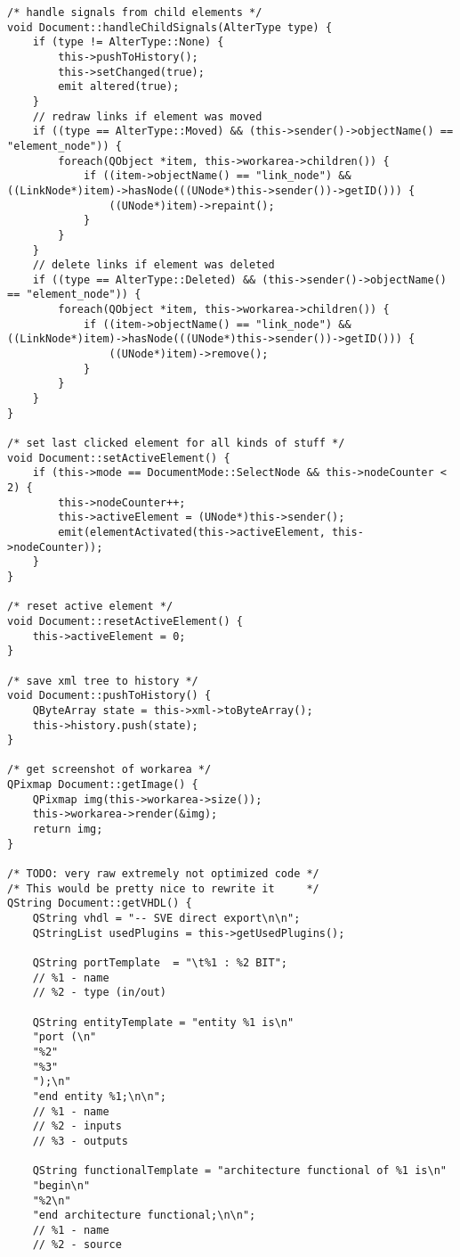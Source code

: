 \begin{lstlisting}
/* handle signals from child elements */
void Document::handleChildSignals(AlterType type) {
    if (type != AlterType::None) {
        this->pushToHistory();
        this->setChanged(true);
        emit altered(true);
    }
    // redraw links if element was moved
    if ((type == AlterType::Moved) && (this->sender()->objectName() == "element_node")) {
        foreach(QObject *item, this->workarea->children()) {
            if ((item->objectName() == "link_node") && ((LinkNode*)item)->hasNode(((UNode*)this->sender())->getID())) {
                ((UNode*)item)->repaint();
            }
        }
    }
    // delete links if element was deleted
    if ((type == AlterType::Deleted) && (this->sender()->objectName() == "element_node")) {
        foreach(QObject *item, this->workarea->children()) {
            if ((item->objectName() == "link_node") && ((LinkNode*)item)->hasNode(((UNode*)this->sender())->getID())) {
                ((UNode*)item)->remove();
            }
        }
    }
}

/* set last clicked element for all kinds of stuff */
void Document::setActiveElement() {
    if (this->mode == DocumentMode::SelectNode && this->nodeCounter < 2) {
        this->nodeCounter++;
        this->activeElement = (UNode*)this->sender();
        emit(elementActivated(this->activeElement, this->nodeCounter));
    }
}

/* reset active element */
void Document::resetActiveElement() {
    this->activeElement = 0;
}

/* save xml tree to history */
void Document::pushToHistory() {
    QByteArray state = this->xml->toByteArray();
    this->history.push(state);
}

/* get screenshot of workarea */
QPixmap Document::getImage() {
    QPixmap img(this->workarea->size());
    this->workarea->render(&img);
    return img;
}

/* TODO: very raw extremely not optimized code */
/* This would be pretty nice to rewrite it     */
QString Document::getVHDL() {
    QString vhdl = "-- SVE direct export\n\n";
    QStringList usedPlugins = this->getUsedPlugins();

    QString portTemplate  = "\t%1 : %2 BIT";
    // %1 - name
    // %2 - type (in/out)

    QString entityTemplate = "entity %1 is\n"
    "port (\n"
    "%2"
    "%3"
    ");\n"
    "end entity %1;\n\n";
    // %1 - name
    // %2 - inputs
    // %3 - outputs

    QString functionalTemplate = "architecture functional of %1 is\n"
    "begin\n"
    "%2\n"
    "end architecture functional;\n\n";
    // %1 - name
    // %2 - source


\end{lstlisting}
